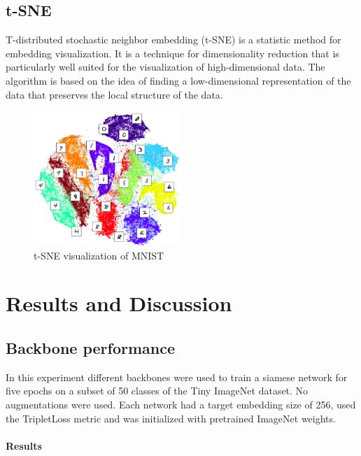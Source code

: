 \documentclass[12pt,a4paper]{report}
\begin{document}
\newpage

\section{t-SNE}
T-distributed stochastic neighbor embedding (t-SNE) is a statistic method for embedding visualization.
It is a technique for dimensionality reduction that is particularly well suited for the visualization of high-dimensional data.
The algorithm is based on the idea of finding a low-dimensional representation of the data that preserves the local structure of the data.

\begin{figure}[h]
    \centering
    \includegraphics[width=0.5\textwidth]{./images/tsne-mnist.png}
	\caption{t-SNE visualization of MNIST}
\end{figure}

\chapter{Results and Discussion}

\newpage

\section{Backbone performance}
In this experiment different backbones were used to train a siamese network for five epochs on a subset of 50 classes of the Tiny ImageNet dataset.
No augmentations were used.
Each network had a target embedding size of 256, used the TripletLoss metric and was initialized with pretrained ImageNet weights.

\subsubsection{Results}
\end{document}
